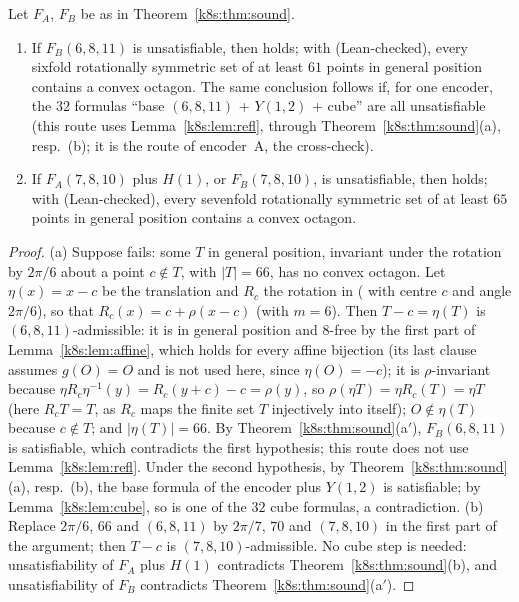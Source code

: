 \begin{corollary}\label{k8s:cor:geom}
Let $F_A$, $F_B$ be as in Theorem~\ref{k8s:thm:sound}.
\begin{enumerate}[label=(\alph*)]
\item If $F_B(6,8,11)$ is unsatisfiable, then  holds; with  (Lean-checked), every
sixfold rotationally symmetric set of at least $61$ points in general position contains a convex octagon. The same
conclusion follows if, for one encoder, the $32$ formulas ``base $(6,8,11)$ + $Y(1,2)$ + cube'' are all unsatisfiable
(this route uses Lemma~\ref{k8s:lem:refl}, through Theorem~\ref{k8s:thm:sound}(a), resp.~(b); it is the route of
encoder~A, the cross-check).
\item If $F_A(7,8,10)$ plus $H(1)$, or $F_B(7,8,10)$, is unsatisfiable, then  holds; with
 (Lean-checked), every sevenfold rotationally symmetric set of at least $65$ points in general
position contains a convex octagon.
\end{enumerate}
\end{corollary}

\begin{proof}
(a) Suppose  fails: some $T$ in general position, invariant under the rotation by $2\pi/6$ about a
point $c\notin T$, with $|T|=66$, has no convex octagon. Let $\eta(x)=x-c$ be the translation and $R_c$ the rotation in 
( with centre $c$ and angle $2\pi/6$), so that $R_c(x)=c+\rho(x-c)$ (with $m=6$). Then $T-c=\eta(T)$ is $(6,8,11)$-admissible: it is in
general position and $8$-free by the first part of Lemma~\ref{k8s:lem:affine}, which holds for every affine bijection
(its last clause assumes $g(O)=O$ and is not used here, since $\eta(O)=-c$); it is $\rho$-invariant because
$\eta R_c\eta^{-1}(y)=R_c(y+c)-c=\rho(y)$, so $\rho(\eta T)=\eta R_c(T)=\eta T$ (here $R_cT=T$, as $R_c$ maps the finite
set $T$ injectively into itself); $O\notin\eta(T)$ because $c\notin T$; and $|\eta(T)|=66$. By
Theorem~\ref{k8s:thm:sound}(a$'$), $F_B(6,8,11)$ is satisfiable, which contradicts the first hypothesis; this route does
not use Lemma~\ref{k8s:lem:refl}. Under the second hypothesis, by Theorem~\ref{k8s:thm:sound}(a), resp.~(b), the base
formula of the encoder plus $Y(1,2)$ is satisfiable; by Lemma~\ref{k8s:lem:cube}, so is one of the $32$ cube formulas,
a contradiction. (b) Replace $2\pi/6$, $66$ and $(6,8,11)$ by $2\pi/7$, $70$ and $(7,8,10)$ in the first part of the
argument; then $T-c$ is $(7,8,10)$-admissible. No cube step is needed: unsatisfiability of $F_A$ plus $H(1)$
contradicts Theorem~\ref{k8s:thm:sound}(b), and unsatisfiability of $F_B$ contradicts
Theorem~\ref{k8s:thm:sound}(a$'$).
\end{proof}

